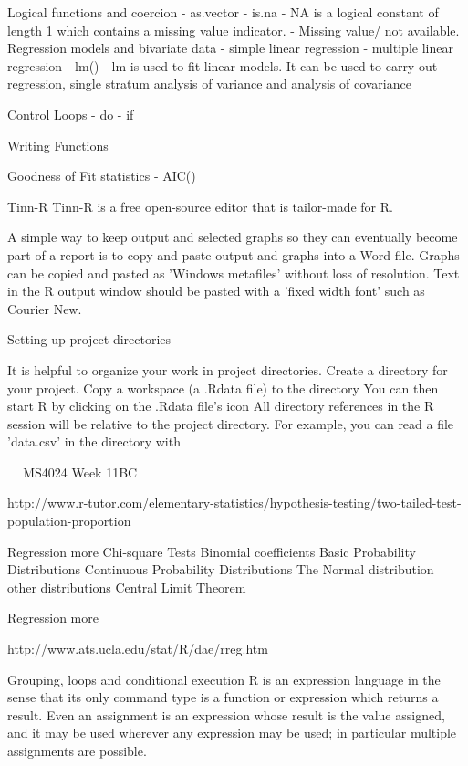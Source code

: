 \documentclass[a4paper,12pt]{article}
\begin{document}
Logical functions and coercion
 - as.vector
 - is.na
 - NA is a logical constant of length 1 which contains a missing value indicator.
 - Missing value/ not available. 
Regression models and bivariate data
 - simple linear regression 
 - multiple linear regression 
 - lm()
 - lm is used to fit linear models. It can be used to carry out regression, single stratum analysis of variance and analysis of covariance 

Control Loops
 - do 
 - if 

Writing Functions

Goodness of Fit statistics
 - AIC()




Tinn-R
Tinn-R is a free open-source editor that is tailor-made for R. 

A simple way to keep output and selected graphs so they can eventually become part of a report is to copy and paste output and graphs into a Word file. Graphs can be copied and pasted as 'Windows metafiles' without loss of resolution. Text in the R output window should be pasted with a 'fixed width font' such as Courier New.

Setting up project directories

It is helpful to organize your work in project directories.
Create a directory for your project.
Copy a workspace (a .Rdata file) to the directory
You can then start R by clicking on the .Rdata file's icon
All directory references in the R session will be relative to the project directory. For example, you can read a file 'data.csv' in the directory with


 
MS4024 Week 11BC

 
http://www.r-tutor.com/elementary-statistics/hypothesis-testing/two-tailed-test-population-proportion
 

Regression more
Chi-square Tests
Binomial coefficients
Basic Probability Distributions
Continuous Probability Distributions
The Normal distribution
other distributions
Central Limit Theorem

Regression more

http://www.ats.ucla.edu/stat/R/dae/rreg.htm

Grouping, loops and conditional execution
R is an expression language in the sense that its only command type is a function or expression which returns a result. Even an assignment is an expression whose result is the value assigned, and it may be used wherever any expression may be used; in particular multiple assignments are possible.
\end{document}
